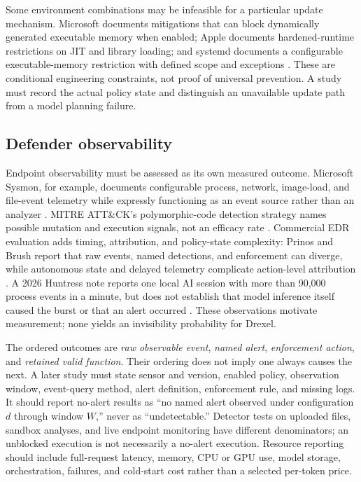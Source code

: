 \documentclass[11pt,letterpaper]{article}
\begin{document}
Some environment combinations may be infeasible for a particular update mechanism. Microsoft documents mitigations that can block dynamically generated executable memory when enabled; Apple documents hardened-runtime restrictions on JIT and library loading; and systemd documents a configurable executable-memory restriction with defined scope and exceptions \cite{msmitigations,applehardened,systemdexec}. These are conditional engineering constraints, not proof of universal prevention. A study must record the actual policy state and distinguish an unavailable update path from a model planning failure.

\subsection{Defender observability}

Endpoint observability must be assessed as its own measured outcome. Microsoft Sysmon, for example, documents configurable process, network, image-load, and file-event telemetry while expressly functioning as an event source rather than an analyzer \cite{sysmon}. MITRE ATT\&CK's polymorphic-code detection strategy names possible mutation and execution signals, not an efficacy rate \cite{mitrepoly}. Commercial EDR evaluation adds timing, attribution, and policy-state complexity: Prinos and Brush report that raw events, named detections, and enforcement can diverge, while autonomous state and delayed telemetry complicate action-level attribution \cite{prinos}. A 2026 Huntress note reports one local AI session with more than 90,000 process events in a minute, but does not establish that model inference itself caused the burst or that an alert occurred \cite{huntress}. These observations motivate measurement; none yields an invisibility probability for Drexel.

The ordered outcomes are \emph{raw observable event}, \emph{named alert}, \emph{enforcement action}, and \emph{retained valid function}. Their ordering does not imply one always causes the next. A later study must state sensor and version, enabled policy, observation window, event-query method, alert definition, enforcement rule, and missing logs. It should report no-alert results as ``no named alert observed under configuration $d$ through window $W$,'' never as ``undetectable.'' Detector tests on uploaded files, sandbox analyses, and live endpoint monitoring have different denominators; an unblocked execution is not necessarily a no-alert execution. Resource reporting should include full-request latency, memory, CPU or GPU use, model storage, orchestration, failures, and cold-start cost rather than a selected per-token price.
\end{document}
